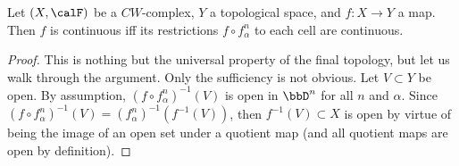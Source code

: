 \begin{prop}[{{\cite[Prop.~3.1.11]{RS2}}}]\label{prop 3.1.11 RS2}
    Let $(X,\calF )$ be a $CW$-complex, $Y$ a topological space, and $f:X\to Y$ a map. Then $f$ is continuous iff its restrictions $f\circ f_\alpha^n$ to each cell are continuous.
\end{prop}
\begin{proof}
    This is nothing but the universal property of the final topology, but let us walk through the argument. Only the sufficiency is not obvious. Let $V\subset Y$ be open. By assumption, $(f\circ f_\alpha^n)^{-1}(V)$ is open in $\bbD^n$ for all $n$ and $\alpha$. Since $(f\circ f_\alpha^n)^{-1}(V)=(f_\alpha^n)^{-1}(f^{-1}(V))$, then $f^{-1}(V)\subset X$ is open by virtue of being the image of an open set under a quotient map (and all quotient maps are open by definition). 
\end{proof}


